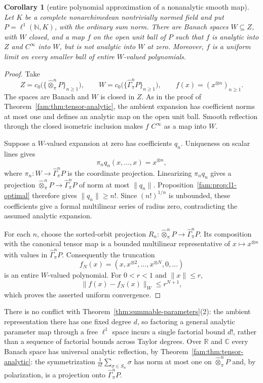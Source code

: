 \documentclass[11pt]{amsart}
\newtheorem{corollary}[theorem]{Corollary}
\theoremstyle{definition}
\theoremstyle{remark}
\numberwithin{equation}{section}
\newcommand{\N}{\mathbb N}
\newcommand{\norm}[1]{\lVert #1\rVert}
\theoremstyle{plain}
\theoremstyle{definition}
\theoremstyle{plain}
\begin{document}
\begin{corollary}[entire polynomial approximation of a nonanalytic smooth map]
\label{fam:cor:no-common-radius}
Let $K$ be a complete nonarchimedean nontrivially normed field and put
$P=\ell^1(\N,K)$, with the ordinary sum norm. There are Banach spaces
$W\subseteq Z$, with $W$ closed, and a map $f$ on the open unit ball of $P$
such that $f$ is analytic into $Z$ and $C^\infty$ into $W$, but is not analytic
into $W$ at zero. Moreover, $f$ is a uniform limit on every smaller ball of
entire $W$\nobreakdash-valued polynomials.
\end{corollary}

\begin{proof}
Take
\[
 Z=c_0\bigl(\{\widehat\otimes^n_\pi P\}_{n\ge1}\bigr),\qquad
 W=c_0\bigl(\{\widehat\Gamma^n_\pi P\}_{n\ge1}\bigr),\qquad
 f(x)=(x^{\otimes n})_{n\ge1}.
\]
The spaces are Banach and $W$ is closed in $Z$. As in the proof of
Theorem~\ref{fam:thm:tensor-analytic}, the ambient expansion has coefficient
norms at most one and defines an analytic map on the open unit ball.
Smooth reflection through the closed isometric inclusion makes $f$
$C^\infty$ as a map into $W$.

Suppose a $W$\nobreakdash-valued expansion at zero has coefficients $q_n$.
Uniqueness on scalar lines gives
\[
 \pi_nq_n(x,\ldots,x)=x^{\otimes n},
\]
where $\pi_n\colon W\to\widehat\Gamma^n_\pi P$ is the coordinate projection.
Linearizing $\pi_nq_n$ gives a projection
$\widehat\otimes^n_\pi P\to\widehat\Gamma^n_\pi P$ of norm at most $\norm{q_n}$.
Proposition~\ref{fam:prop:l1-optimal} therefore gives
$\norm{q_n}\ge n!$. Since $(n!)^{1/n}$ is unbounded, these coefficients
give a formal multilinear series of radius zero, contradicting the assumed analytic expansion.

For each $n$, choose the sorted-orbit projection
$R_n\colon \widehat\otimes^n_\pi P\to\widehat\Gamma^n_\pi P$. Its composition with the canonical
tensor map is a bounded multilinear representative of $x\mapsto x^{\otimes n}$
with values in $\widehat\Gamma^n_\pi P$. Consequently the truncation
\[
 f_N(x)=(x,x^{\otimes2},\ldots,x^{\otimes N},0,\ldots)
\]
is an entire $W$\nobreakdash-valued polynomial. For $0<r<1$ and $\norm x\le r$,
\[
 \norm{f(x)-f_N(x)}_W\le r^{N+1},
\]
which proves the asserted uniform convergence.
\end{proof}


There is no conflict with Theorem~\ref{thm:summable-parameters}(2): the ambient representation there has one fixed
degree $d$, so factoring a general analytic parameter map through a free $\ell^1$ space incurs a single factorial
bound $d!$, rather than a sequence of factorial bounds across Taylor degrees.
Over $\mathbb R$ and $\mathbb C$ every Banach space has universal analytic reflection, by Theorem~\ref{fam:thm:tensor-analytic}: the symmetrization $\frac1{n!}\sum_{\sigma\in S_n}\sigma$ has norm at most one on $\widehat\otimes^n_\pi P$ and, by polarization, is a projection onto $\widehat\Gamma^n_\pi P$.
\end{document}
